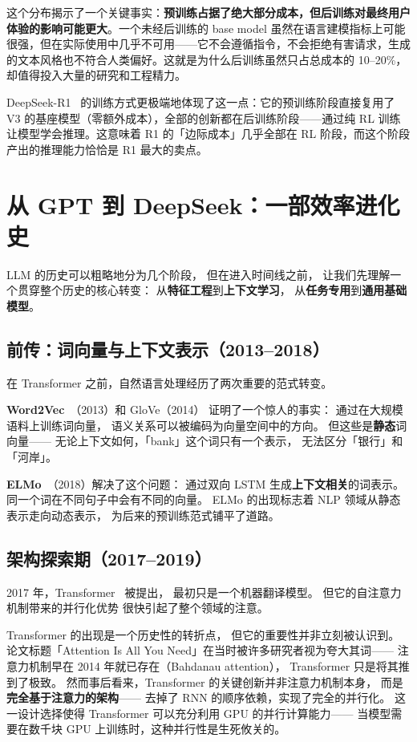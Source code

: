 这个分布揭示了一个关键事实：\textbf{预训练占据了绝大部分成本，但后训练对最终用户体验的影响可能更大}。一个未经后训练的 base model 虽然在语言建模指标上可能很强，但在实际使用中几乎不可用——它不会遵循指令，不会拒绝有害请求，生成的文本风格也不符合人类偏好。这就是为什么后训练虽然只占总成本的 10--20\%，却值得投入大量的研究和工程精力。

DeepSeek-R1~\cite{deepseekr1} 的训练方式更极端地体现了这一点：它的预训练阶段直接复用了 V3 的基座模型（零额外成本），全部的创新都在后训练阶段——通过纯 RL 训练让模型学会推理。这意味着 R1 的「边际成本」几乎全部在 RL 阶段，而这个阶段产出的推理能力恰恰是 R1 最大的卖点。

\section{从 GPT 到 DeepSeek：一部效率进化史}

LLM 的历史可以粗略地分为几个阶段，
但在进入时间线之前，
让我们先理解一个贯穿整个历史的核心转变：
从\textbf{特征工程}到\textbf{上下文学习}，
从\textbf{任务专用}到\textbf{通用基础模型}。

\subsection{前传：词向量与上下文表示（2013--2018）}

在 Transformer 之前，自然语言处理经历了两次重要的范式转变。

\textbf{Word2Vec}~\cite{mikolov2013word2vec}（2013）和 GloVe（2014）
证明了一个惊人的事实：
通过在大规模语料上训练词向量，
语义关系可以被编码为向量空间中的方向。
但这些是\textbf{静态}词向量——
无论上下文如何，「bank」这个词只有一个表示，
无法区分「银行」和「河岸」。

\textbf{ELMo}~\cite{peters2018elmo}（2018）解决了这个问题：
通过双向 LSTM 生成\textbf{上下文相关}的词表示。
同一个词在不同句子中会有不同的向量。
ELMo 的出现标志着 NLP 领域从静态表示走向动态表示，
为后来的预训练范式铺平了道路。

\subsection{架构探索期（2017--2019）}

2017 年，Transformer~\cite{vaswani2017attention} 被提出，
最初只是一个机器翻译模型。
但它的自注意力机制带来的并行化优势
很快引起了整个领域的注意。

Transformer 的出现是一个历史性的转折点，
但它的重要性并非立刻被认识到。
论文标题「Attention Is All You Need」在当时被许多研究者视为夸大其词——
注意力机制早在 2014 年就已存在（Bahdanau attention），
Transformer 只是将其推到了极致。
然而事后看来，Transformer 的关键创新并非注意力机制本身，
而是\textbf{完全基于注意力的架构}——
去掉了 RNN 的顺序依赖，实现了完全的并行化。
这一设计选择使得 Transformer 可以充分利用 GPU 的并行计算能力——
当模型需要在数千块 GPU 上训练时，这种并行性是生死攸关的。

